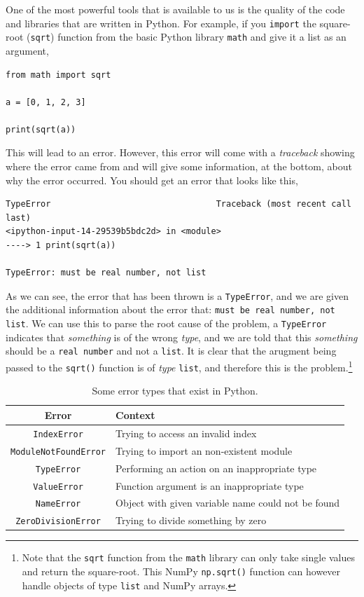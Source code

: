 \documentclass[a4paper]{article}
\begin{document}
One of the most powerful tools that is available to us is the quality of the code and libraries that are written in Python.
For example, if you \texttt{import} the square-root (\texttt{sqrt}) function from the basic Python library \texttt{math} and give it a list as an argument,
\begin{lstlisting}
from math import sqrt

a = [0, 1, 2, 3]

print(sqrt(a))
\end{lstlisting}
This will lead to an error.
However, this error will come with a \emph{traceback} showing where the error came from and will give some information, at the bottom, about why the error occurred.
You should get an error that looks like this,
\begin{lstlisting}
TypeError                                 Traceback (most recent call last)
<ipython-input-14-29539b5bdc2d> in <module>
----> 1 print(sqrt(a))

TypeError: must be real number, not list
\end{lstlisting}
As we can see, the error that has been thrown is a \texttt{TypeError}, and we are given the additional information about the error that: \texttt{must be real number, not list}.
We can use this to parse the root cause of the problem, a \texttt{TypeError} indicates that \emph{something} is of the wrong \emph{type}, and we are told that this \emph{something} should be a \texttt{real number} and not a \texttt{list}.
It is clear that the arugment being passed to the \texttt{sqrt()} function is of \emph{type} \texttt{list}, and therefore this is the problem.\footnote{Note that the \texttt{sqrt} function from the \texttt{math} library can only take single values and return the square-root. This NumPy \texttt{np.sqrt()} function can however handle objects of type \texttt{list} and NumPy arrays.}
\begin{table}[h]
	\centering
	\caption{Some error types that exist in Python.}
	\label{tab:ops}
	\begin{tabular}{c p{}}
		\hline
		Error & Context \\
		\hline
		\texttt{IndexError} & Trying to access an invalid index \\
		\texttt{ModuleNotFoundError} & Trying to import an non-existent module \\
		\texttt{TypeError} & Performing an action on an inappropriate type \\
		\texttt{ValueError} & Function argument is an inappropriate type \\
		\texttt{NameError} & Object with given variable name could not be found \\
		\texttt{ZeroDivisionError} & Trying to divide something by zero \\
		\hline
	\end{tabular}
\end{table}
\end{document}
